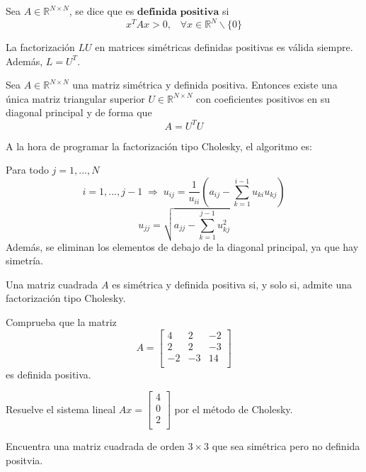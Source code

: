 \begin{ndef}
Sea $A \in \mathbb{R}^{N \times N}$, se dice que es $\textbf{definida positiva}$ si
\[ x^TAx > 0, \; \; \; \forall x \in \mathbb{R}^N \backslash \lbrace 0 \rbrace \]
\end{ndef}
			
La factorización $LU$ en matrices simétricas definidas positivas es válida siempre. Además, $L = U^T$.
			
\begin{ndef}
Sea $A \in \mathbb{R}^{N \times N}$ una matriz simétrica y definida positiva. Entonces existe una única matriz triangular superior $U \in \mathbb{R}^{N \times N}$ con coeficientes positivos en su diagonal principal y de forma que
\[ A = U^TU \]
\end{ndef}
			
A la hora de programar la factorización tipo Cholesky, el algoritmo es:

Para todo $j = 1,...,N$
\[ i = 1,...,j-1 \; \Rightarrow \; u_{ij} = \frac{1}{u_{ii}} \left( a_{ij} - \sum_{k=1}^{i-1} u_{ki}u_{kj} \right) \]
\[ u_{jj} = \sqrt{a_{jj} - \sum_{k=1}^{j-1}u_{kj}^2} \]
Además, se eliminan los elementos de debajo de la diagonal principal, ya que hay simetría.
			
\begin{nprop}
Una matriz cuadrada $A$ es simétrica y definida positiva si, y solo si, admite una factorización tipo Cholesky.
\end{nprop}

\begin{ejer}
Comprueba que la matriz 
\[ A = \begin{bmatrix}
4 & 2 & -2 \\
2 & 2 & -3 \\
-2 & -3 & 14 \\
\end{bmatrix}\]
es definida positiva.
\end{ejer}

\begin{ejer}
Resuelve el sistema lineal $Ax = \begin{bmatrix}
4 \\
0 \\
2 \\
\end{bmatrix}$ por el método de Cholesky.
\end{ejer}

\begin{ejer}
Encuentra una matriz cuadrada de orden $3 \times 3$ que sea simétrica pero no definida positvia.
\end{ejer}
		

